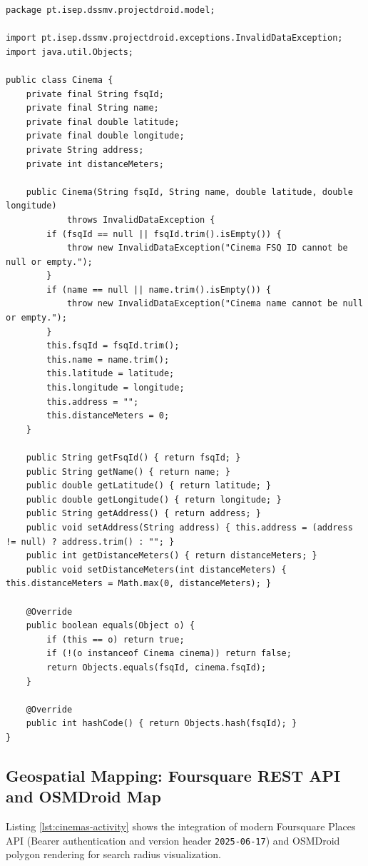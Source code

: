 \documentclass[runningheads,a4paper]{llncs}
\begin{document}
\begin{lstlisting}[style=javastyle,caption={Pure Java 21 Cinema Domain Entity (Cinema.java)},label={lst:cinema-model}]
package pt.isep.dssmv.projectdroid.model;

import pt.isep.dssmv.projectdroid.exceptions.InvalidDataException;
import java.util.Objects;

public class Cinema {
    private final String fsqId;
    private final String name;
    private final double latitude;
    private final double longitude;
    private String address;
    private int distanceMeters;

    public Cinema(String fsqId, String name, double latitude, double longitude) 
            throws InvalidDataException {
        if (fsqId == null || fsqId.trim().isEmpty()) {
            throw new InvalidDataException("Cinema FSQ ID cannot be null or empty.");
        }
        if (name == null || name.trim().isEmpty()) {
            throw new InvalidDataException("Cinema name cannot be null or empty.");
        }
        this.fsqId = fsqId.trim();
        this.name = name.trim();
        this.latitude = latitude;
        this.longitude = longitude;
        this.address = "";
        this.distanceMeters = 0;
    }

    public String getFsqId() { return fsqId; }
    public String getName() { return name; }
    public double getLatitude() { return latitude; }
    public double getLongitude() { return longitude; }
    public String getAddress() { return address; }
    public void setAddress(String address) { this.address = (address != null) ? address.trim() : ""; }
    public int getDistanceMeters() { return distanceMeters; }
    public void setDistanceMeters(int distanceMeters) { this.distanceMeters = Math.max(0, distanceMeters); }

    @Override
    public boolean equals(Object o) {
        if (this == o) return true;
        if (!(o instanceof Cinema cinema)) return false;
        return Objects.equals(fsqId, cinema.fsqId);
    }

    @Override
    public int hashCode() { return Objects.hash(fsqId); }
}
\end{lstlisting}

\newpage

\subsection{Geospatial Mapping: Foursquare REST API and OSMDroid Map}
Listing \ref{lst:cinemas-activity} shows the integration of modern Foursquare Places API (Bearer authentication and version header \texttt{2025-06-17}) and OSMDroid polygon rendering for search radius visualization.
\end{document}
